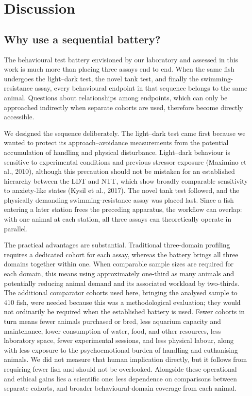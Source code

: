 \documentclass[12pt,a4paper]{article}
\begin{document}
\section{Discussion}

\subsection{Why use a sequential battery?}

The behavioural test battery envisioned by our laboratory and assessed in this work is much more than placing three assays end to end. When the same fish undergoes the light--dark test, the novel tank test, and finally the swimming-resistance assay, every behavioural endpoint in that sequence belongs to the same animal. Questions about relationships among endpoints, which can only be approached indirectly when separate cohorts are used, therefore become directly accessible.

We designed the sequence deliberately. The light--dark test came first because we wanted to protect its approach--avoidance measurements from the potential accumulation of handling and physical disturbance. Light--dark behaviour is sensitive to experimental conditions and previous stressor exposure (Maximino et al., 2010), although this precaution should not be mistaken for an established hierarchy between the LDT and NTT, which show broadly comparable sensitivity to anxiety-like states (Kysil et al., 2017). The novel tank test followed, and the physically demanding swimming-resistance assay was placed last. Since a fish entering a later station frees the preceding apparatus, the workflow can overlap: with one animal at each station, all three assays can theoretically operate in parallel.

The practical advantages are substantial. Traditional three-domain profiling requires a dedicated cohort for each assay, whereas the battery brings all three domains together within one. When comparable sample sizes are required for each domain, this means using approximately one-third as many animals and potentially reducing animal demand and its associated workload by two-thirds. The additional comparator cohorts used here, bringing the analysed sample to 410 fish, were needed because this was a methodological evaluation; they would not ordinarily be required when the established battery is used. Fewer cohorts in turn means fewer animals purchased or bred, less aquarium capacity and maintenance, lower consumption of water, food, and other resources, less laboratory space, fewer experimental sessions, and less physical labour, along with less exposure to the psychoemotional burden of handling and euthanising animals. We did not measure that human implication directly, but it follows from requiring fewer fish and should not be overlooked. Alongside these operational and ethical gains lies a scientific one: less dependence on comparisons between separate cohorts, and broader behavioural-domain coverage from each animal.
\end{document}
